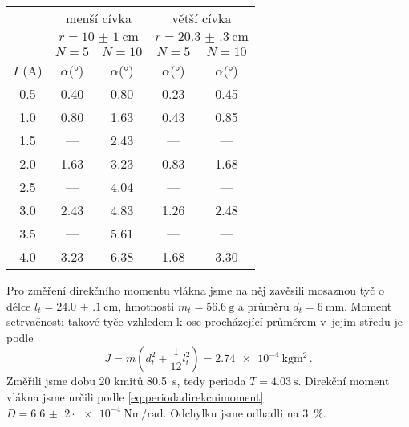 \begin{tabulka}[htbp]
\centering
\begin{tabular}{c|c|c|c|c}

 & \multicolumn{2}{c|}{menší cívka} & \multicolumn{2}{c}{větší cívka} \\
  & \multicolumn{2}{c|}{$r = \SI{10(1)}{\cm} $} & \multicolumn{2}{c}{$r= \SI{20.3(3)}{\cm} $} \\
  
  & $N=5$ & $N=10$ & $N=5$ & $N=10$ \\ \hline
  
$I$ (\si{\ampere}) & $\alpha$(\si{\degree}) & $\alpha$(\si{\degree}) & $\alpha$(\si{\degree}) & $\alpha$(\si{\degree}) \\
\hline

\num{0.5} & \num{0.40} & \num{0.80} & \num{0.23} & \num{0.45} \\
\num{1.0} & \num{0.80} & \num{1.63} & \num{0.43} & \num{0.85} \\
\num{1.5} & --- & \num{2.43} & --- & --- \\
\num{2.0} & \num{1.63} & \num{3.23} & \num{0.83} & \num{1.68} \\
\num{2.5} & --- & \num{4.04} & --- & --- \\
\num{3.0} & \num{2.43} & \num{4.83} & \num{1.26} & \num{2.48} \\
\num{3.5} & --- & \num{5.61} & --- & --- \\
\num{4.0} & \num{3.23} & \num{6.38} & \num{1.68} & \num{3.30} \\

\end{tabular}
\caption{Naměřená závislost úhlu otočení magnetu na volbě cívky a proudu jí protékajícím}
\label{tab:tabmain}
\end{tabulka}

\begin{graph}[htbp] 
\centering

\caption{Naměřená závislost úhlu otočení magnetu na volbě cívky a proudu jí protékající, teoretická závislost \eqref{eq:vzorecalfa} s nafitovaným magnetickým momentem $p$}
\label{graf:grafmain}
\end{graph}


Pro změření direkčního momentu vlákna jsme na něj zavěsili mosaznou tyč o délce $l_t=\SI{24.0(1)}{\cm}$, hmotnosti $m_t=\SI{56.6}{\g}$ a průměru $d_t=\SI{6}{\mm}$.
Moment setrvačnosti takové tyče vzhledem k ose procházející průměrem v~jejím středu je podle \cite{momentset}
\begin{equation} \label{eq:momentsetrvacnosti}
J=m(d_t^2+\frac{1}{12} l_t^2)= \SI{2.74e-4}{\kg\m\squared} \,.
\end{equation}
Změřili jsme dobu 20 kmitů \SI{80.5}{\s}, tedy perioda $T=\SI{4.03}{\s}$.
Direkční moment vlákna jsme určili podle \eqref{eq:periodadirekcnimoment} $D=\num{6.6(2)}\cdot \SI{e-4}{\newton\metre\per\radian}$. Odchylku jsme odhadli na \SI{3}{\percent}.

